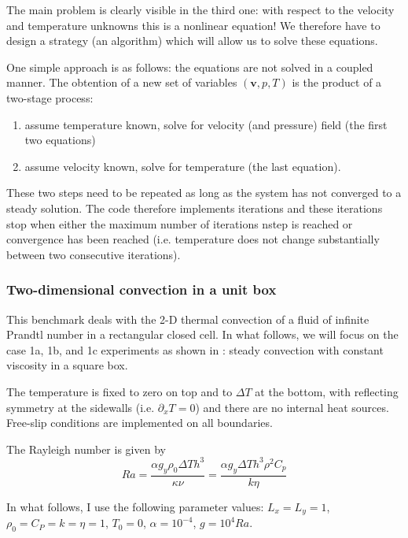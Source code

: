 The main problem is clearly visible in the third one: with respect to the velocity and 
temperature unknowns this is a nonlinear equation! 
We therefore have to design a strategy (an algorithm) which will allow us to solve these 
equations. 

One simple approach is as follows: the equations are not solved in a coupled manner. 
The obtention of a new set of variables $({\bm v},p,T)$ is the product of a two-stage process:
\begin{enumerate}
\item assume temperature known, solve for velocity (and pressure) field (the first two equations)
\item assume velocity known, solve for temperature (the last equation).
\end{enumerate}
These two steps need to be repeated as long as the system has not converged to a steady solution. 
The code therefore implements iterations and these iterations stop when either the maximum number 
of iterations nstep is reached or convergence has been reached (i.e. temperature does not change 
substantially between two consecutive iterations).





\subsubsection{Two-dimensional convection in a unit box}

This benchmark deals with the 2-D thermal convection of a fluid 
of infinite Prandtl number in a rectangular closed cell.
In what follows, we will focus on the case 1a, 1b, and 1c experiments as shown in \cite{blbc89}:
steady convection with constant viscosity in a square box.

The temperature is fixed to zero on top and to $\Delta T$ at the bottom, 
with reflecting symmetry at the sidewalls (i.e. $\partial_x T=0$) 
and there are no internal heat sources. 
Free-slip conditions are implemented on all boundaries. 

The Rayleigh number is given by
\begin{equation}
Ra = \frac{\alpha g_y \rho_0 \Delta T h^3 }{\kappa \nu}
=\frac{\alpha g_y \Delta T h^3 \rho^2 C_p}{k \eta}
\end{equation}

In what follows, I use the following parameter values:  
$L_x=L_y=1$,$\rho_0=C_P=k=\eta=1$, $T_0=0$, $\alpha=10^{-4}$, $g=10^{4}Ra$.

